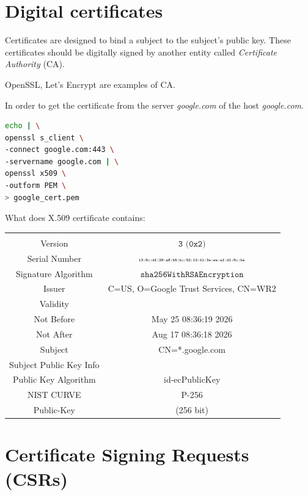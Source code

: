 \documentclass[a4paper, 12pt]{book} %
\begin{document}
\section{Digital certificates}

Certificates are designed to bind a subject to the subject's public key. These certificates should be digitally signed by another entity called \emph{Certificate Authority} (CA).

\begin{example}
    OpenSSL, Let's Encrypt are examples of CA.
\end{example}


In order to get the certificate from the server \emph{google.com} of the host \emph{google.com}.
\begin{lstlisting}[style=darkbash, language=bash]
echo | \
openssl s_client \
-connect google.com:443 \
-servername google.com | \
openssl x509 \
-outform PEM \
> google_cert.pem
\end{lstlisting}


What does X.509 certificate contains:
\begin{table}[H]
    \begin{tabular}{|c|c|} \hline \\
        Version & $\texttt{3 (0x2)}$\\ \hline 
        Serial Number & $\texttt{\tiny 13:9c:df:29:a8:b5:bc:52:12:41:3e:ee:af:d1:8c:be}$ \\ \hline 
        Signature Algorithm & $\texttt{sha256WithRSAEncryption}$ \\ \hline 
        Issuer &  C=US, O=Google Trust Services, CN=WR2 \\
        Validity & \\
        Not Before & May 25 08:36:19 2026 \\
        Not After & Aug 17 08:36:18 2026 \\
        Subject & CN=*.google.com \\
        Subject Public Key Info &  \\
        Public Key Algorithm &  id-ecPublicKey \\
        NIST CURVE &  P-256 \\
        Public-Key & (256 bit) \\
    \end{tabular}
\end{table}

\section{Certificate Signing Requests (CSRs)}
\end{document}
